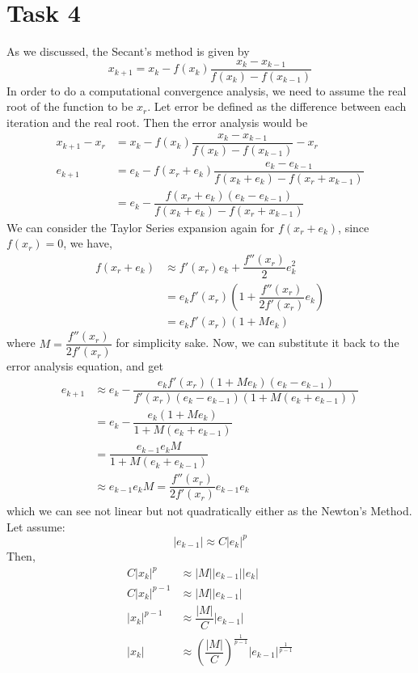 \documentclass{article}
\begin{document}
\newpage

\section*{Task 4}
As we discussed, the Secant's method is given by 
$$x_{k+1} = x_k - f\left(x_k\right)\dfrac{x_k - x_{k-1}}{f\left(x_k\right) - f\left(x_{k-1}\right)}$$
In order to do a computational convergence analysis, we need to assume the real root of the function to be $x_r$. Let error be defined as the difference between each iteration and the real root. Then the error analysis would be
\begin{align*}
x_{k+1} - x_r &= x_k - f\left(x_k\right)\dfrac{x_k - x_{k-1}}{f\left(x_k\right) - f\left(x_{k-1}\right)}- x_r\\
e_{k+1} & = e_k - f\left(x_r + e_k\right)\dfrac{e_k - e_{k-1}}{f\left(x_k + e_k\right) - f\left(x_r + x_{k-1}\right)} \\
		& = e_k - \dfrac{f\left(x_r + e_k\right)\left(e_k - e_{k-1}\right)}{f\left(x_k + e_k\right) - f\left(x_r + x_{k-1}\right)}
\end{align*}
We can consider the Taylor Series expansion again for $f(x_r + e_k)$, since $f(x_r) = 0$, we have,
\begin{align*}
f(x_r + e_k) &\approx f'(x_r)e_k + \dfrac{f''(x_r)}{2}e_k^2\\
		& = e_kf'(x_r) \left(1 + \dfrac{f''(x_r)}{2f'(x_r)}e_k\right)\\
		& = e_kf'(x_r) \left(1 + Me_k\right)
\end{align*}
where $M = \dfrac{f''(x_r)}{2f'(x_r)}$ for simplicity sake. Now, we can substitute it back to the error analysis equation, and get
\begin{align*}
e_{k+1} &\approx e_k - \dfrac{e_kf'(x_r) \left(1 + Me_k\right)\left(e_k - e_{k-1}\right)}{f'(x_r)\left(e_k - e_{k-1}\right)\left(1 + M(e_k+e_{k-1})\right)}\\
		& = e_k - \dfrac{e_k\left(1 + M e_k\right)}{1 + M\left(e_k + e_{k-1}\right)}\\
		& = \dfrac{e_{k-1}e_kM}{1+ M\left(e_k + e_{k-1}\right)}\\
		&\approx e_{k-1}e_kM = \dfrac{f''(x_r)}{2f'(x_r)}e_{k-1}e_k
\end{align*}
which we can see not linear but not quadratically either as the Newton's Method. Let assume:
$$\left|e_{k-1}\right| \approx C \left|e_k\right|^p$$
Then, 
\begin{align*}
C\left|x_k\right|^p &\approx \left|M\right|\left|e_{k-1}\right|\left|e_k\right|\\
C\left|x_k\right|^{p-1} &\approx \left|M\right|\left|e_{k-1}\right|\\
\left|x_k\right|^{p-1} &\approx \dfrac{\left|M\right|}{C}\left|e_{k-1}\right|\\
\left|x_k\right| &\approx \left(\dfrac{\left|M\right|}{C}\right)^{\frac{1}{p-1}}\left|e_{k-1}\right|^{\frac{1}{p-1}}
\end{align*}
\end{document}
